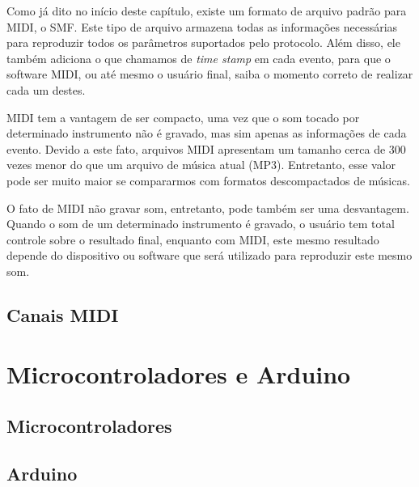             Como já dito no início deste capítulo, existe um formato de arquivo padrão para MIDI, o SMF. Este tipo de arquivo armazena todas as informações necessárias para reproduzir todos os parâmetros suportados pelo protocolo. Além disso, ele também adiciona o que chamamos de \textit{time stamp} em cada evento, para que o software MIDI, ou até mesmo o usuário final, saiba o momento correto de realizar cada um destes.
            
            MIDI tem a vantagem de ser compacto, uma vez que o som tocado por determinado instrumento não é gravado, mas sim apenas as informações de cada evento. Devido a este fato, arquivos MIDI apresentam um tamanho cerca de 300 vezes menor do que um arquivo de música atual (MP3). Entretanto, esse valor pode ser muito maior se compararmos com formatos descompactados de músicas.
            
            O fato de MIDI não gravar som, entretanto, pode também ser uma desvantagem. Quando o som de um determinado instrumento é gravado, o usuário tem total controle sobre o resultado final, enquanto com MIDI, este mesmo resultado depende do dispositivo ou software que será utilizado para reproduzir este mesmo som.
            
        \subsection{Canais MIDI}
        
            

    \section{Microcontroladores e Arduino}



        \subsection{Microcontroladores}



        \subsection{Arduino}

